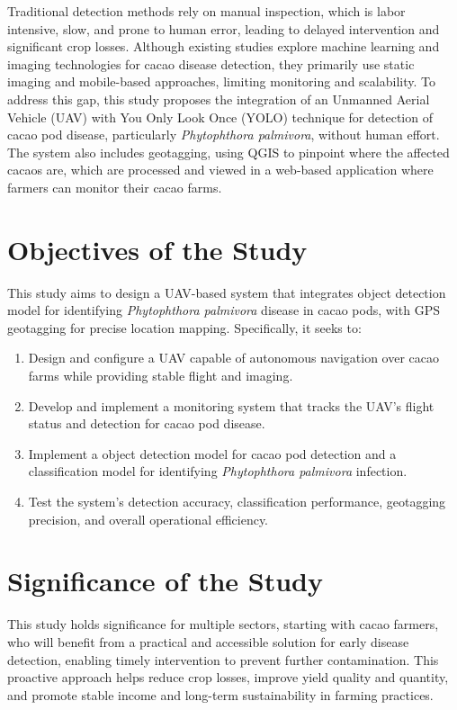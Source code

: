{Traditional detection methods rely on manual inspection, which is labor intensive, slow, and prone to human error, leading to delayed intervention and significant crop losses. Although existing studies explore machine learning and imaging technologies for cacao disease detection, they primarily use static imaging and mobile-based approaches, limiting monitoring and scalability. To address this gap, this study proposes the integration of an Unmanned Aerial Vehicle (UAV) with You Only Look Once (YOLO) technique for detection of cacao pod disease, particularly \textit{Phytophthora palmivora}, without human effort. The system also includes geotagging, using QGIS to pinpoint where the affected cacaos are, which are processed and viewed in a web-based application where farmers can monitor their cacao farms.

\section{Objectives of the Study}

This study aims to design a UAV-based system that integrates object detection model for identifying \textit{Phytophthora palmivora} disease in cacao pods, with GPS geotagging for precise location mapping. Specifically, it seeks to:

\begin{enumerate}
	\item Design and configure a UAV capable of autonomous navigation over cacao farms while providing stable flight and imaging.
	\item Develop and implement a monitoring system that tracks the UAV’s flight status and detection for cacao pod disease.
	\item Implement a object detection model for cacao pod detection and a classification model for identifying \textit{Phytophthora palmivora} infection.
	\item Test the system’s detection accuracy, classification performance, geotagging precision, and overall operational efficiency.
\end{enumerate}

\section{Significance of the Study}

This study holds significance for multiple sectors, starting with cacao farmers, who will benefit from a practical and accessible solution for early disease detection, enabling timely intervention to prevent further contamination. This proactive approach helps reduce crop losses, improve yield quality and quantity, and promote stable income and long-term sustainability in farming practices.

}
